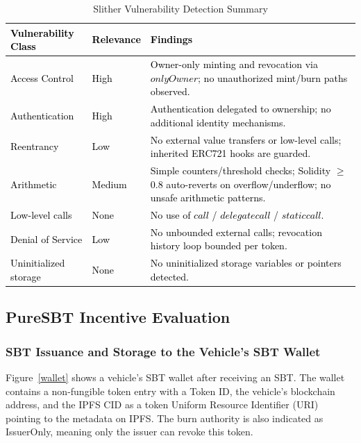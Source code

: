 \cite{cho2010survey}\documentclass[journal,comsoc,twoside]{IEEEtran}
\begin{document}
\begin{table}[!htbp]
\centering
\caption{Slither Vulnerability Detection Summary}
\label{audit}
\begin{tabular}{p{3cm}p{2cm}p{8cm}}
\hline
\textcolor{black}{\textbf{Vulnerability Class}} & \textcolor{black}{\textbf{Relevance}} & \textcolor{black}{\textbf{Findings}} \\ \hline
\textcolor{black}{Access Control}       & \textcolor{black}{High}   & \textcolor{black}{Owner-only minting and revocation via $onlyOwner$; no unauthorized mint/burn paths observed.} \\ 
\textcolor{black}{Authentication}       & \textcolor{black}{High}   & \textcolor{black}{Authentication delegated to ownership; no additional identity mechanisms.} \\
\textcolor{black}{Reentrancy}           & \textcolor{black}{Low}    & \textcolor{black}{No external value transfers or low-level calls; inherited ERC721 hooks are guarded.} \\ 
\textcolor{black}{Arithmetic}           & \textcolor{black}{Medium} & \textcolor{black}{Simple counters/threshold checks; Solidity $\geq$0.8 auto-reverts on overflow/underflow; no unsafe arithmetic patterns.} \\ 
\textcolor{black}{Low-level calls}      & \textcolor{black}{None}   & \textcolor{black}{No use of $call$ / $delegatecall$ / $staticcall$.} \\ 
\textcolor{black}{Denial of Service}    & \textcolor{black}{Low}    & \textcolor{black}{No unbounded external calls; revocation history loop bounded per token.} \\ 
\textcolor{black}{Uninitialized storage} & \textcolor{black}{None}   & \textcolor{black}{No uninitialized storage variables or pointers detected.} \\ \hline
\end{tabular}
\end{table}


\subsection{PureSBT Incentive Evaluation}
\subsubsection{SBT Issuance and Storage to the Vehicle's SBT Wallet}
Figure~\ref{wallet} shows a vehicle's SBT wallet after receiving an SBT. The wallet contains a non-fungible token entry with a Token ID, the vehicle's blockchain address, and the IPFS CID as a token Uniform Resource Identifier (URI) pointing to the metadata on IPFS. The burn authority is also indicated as IssuerOnly, meaning only the issuer can revoke this token.
\end{document}
